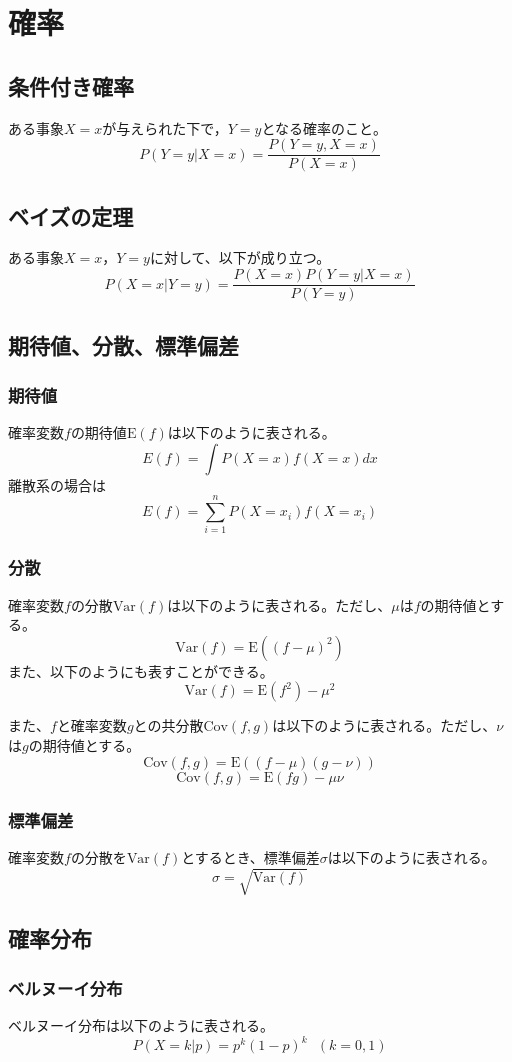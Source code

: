 \documentclass[b5paper,12pt]{jarticle}
\begin{document}
\section{確率}

\subsection{条件付き確率}
ある事象$X=x$が与えられた下で，$Y=y$となる確率のこと。
\[
    P(Y=y|X=x)=\frac{P(Y=y,X=x)}{P(X=x)}
\]
\subsection{ベイズの定理}
ある事象$X=x$，$Y=y$に対して、以下が成り立つ。
\[
    P(X=x|Y=y)=\frac{P(X=x)P(Y=y|X=x)}{P(Y=y)}
\]
\subsection{期待値、分散、標準偏差}
\subsubsection{期待値}
確率変数$f$の期待値$\text{E}(f)$は以下のように表される。
\[
    E(f)=\int P(X=x)f(X=x)dx
\]
離散系の場合は
\[
    E(f)=\sum_{i=1}^n P(X=x_i)f(X=x_i)
\]
\subsubsection{分散}
確率変数$f$の分散$\text{Var}(f)$は以下のように表される。ただし、$\mu$は$f$の期待値とする。
\[
    \text{Var}(f)=\text{E}((f-\mu)^2)
\]
また、以下のようにも表すことができる。
\[
    \text{Var}(f)=\text{E}(f^2)-\mu^2
\]

また、$f$と確率変数$g$との共分散$\text{Cov}(f,g)$は以下のように表される。ただし、$\nu$は$g$の期待値とする。
\[
    \text{Cov}(f,g)=\text{E}((f-\mu)(g-\nu))
\]
\[
    \text{Cov}(f,g)=\text{E}(fg)-\mu\nu
\]

\subsubsection{標準偏差}
確率変数$f$の分散を$\text{Var}(f)$とするとき、標準偏差$\sigma$は以下のように表される。
\[
    \sigma=\sqrt{\text{Var}(f)}
\]

\subsection{確率分布}
\subsubsection{ベルヌーイ分布}
ベルヌーイ分布は以下のように表される。
\[
    P(X=k|p)=p^k(1-p)^k ~~~(k=0,1)
\]
\end{document}
